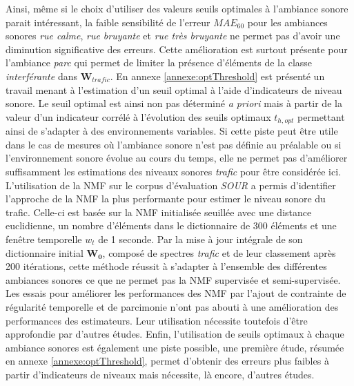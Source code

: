 Ainsi, même si le choix d'utiliser des valeurs seuils optimales à l'ambiance sonore parait intéressant, la faible sensibilité de l'erreur $MAE_{60}$ pour les ambiances sonores \textit{rue calme}, \textit{rue bruyante} et \textit{rue très bruyante} ne permet pas d'avoir une diminution significative des erreurs. Cette amélioration est surtout présente pour l'ambiance \textit{parc} qui permet de limiter la présence d'éléments de la classe \textit{interférante} dans $\mathbf{W}_{trafic}$.
En annexe \ref{annexe:optThreshold} est présenté un travail menant à l'estimation d'un seuil optimal à l'aide d'indicateurs de niveau sonore. Le seuil optimal est ainsi non pas déterminé \textit{a priori} mais à partir de la valeur d'un indicateur corrélé à l'évolution des seuils optimaux $t_{h,opt}$ permettant ainsi de s'adapter à des environnements variables. Si cette piste peut être utile dans le cas de mesures où l'ambiance sonore n'est pas définie au préalable ou si l'environnement sonore évolue au cours du temps, elle ne permet pas d'améliorer suffisamment les estimations des niveaux sonores \textit{trafic} pour être considérée ici.\\

L'utilisation de la NMF sur le corpus d'évaluation \textit{SOUR} a permis d'identifier l'approche de la NMF la plus performante pour estimer le niveau sonore du trafic. Celle-ci est basée sur la NMF initialisée seuillée avec une distance euclidienne, un nombre d'éléments dans le dictionnaire de 300 éléments et une fenêtre temporelle $w_t$ de 1 seconde. Par la mise à jour intégrale de son dictionnaire initial $\mathbf{W_0}$, composé de spectres \textit{trafic} et de leur classement après 200 itérations, cette méthode réussit à s'adapter à l'ensemble des différentes ambiances sonores ce que ne permet pas la NMF supervisée et semi-supervisée. Les essais pour améliorer les performances des NMF par l'ajout de contrainte de régularité temporelle et de parcimonie n'ont pas abouti à une amélioration des performances des estimateurs. Leur utilisation nécessite toutefois d'être approfondie par d'autres études. Enfin, l'utilisation de seuils optimaux à chaque ambiance sonores est également une piste possible, une première étude, résumée en annexe \ref{annexe:optThreshold}, permet d'obtenir des erreurs plus faibles à partir d'indicateurs de niveaux mais nécessite, là encore, d'autres études. 

%